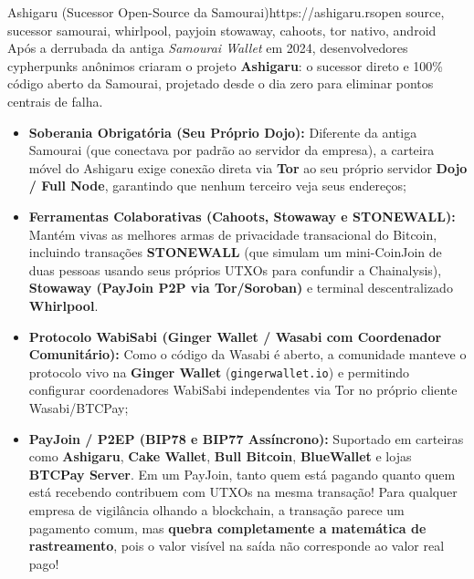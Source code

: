 \documentclass{pousadaguide}
\begin{document}
\begin{ferramenta}[recomendado,logo=ashigaru]{Ashigaru (Sucessor Open-Source da Samourai)}{https://ashigaru.rs}{open source, sucessor samourai, whirlpool, payjoin stowaway, cahoots, tor nativo, android}
Após a derrubada da antiga \emph{Samourai Wallet} em 2024, desenvolvedores cypherpunks anônimos criaram o projeto \textbf{Ashigaru}: o sucessor direto e 100\% código aberto da Samourai, projetado desde o dia zero para eliminar pontos centrais de falha.
\begin{itemize}
  \item \textbf{Soberania Obrigatória (Seu Próprio Dojo):} Diferente da antiga Samourai (que conectava por padrão ao servidor da empresa), a carteira móvel do Ashigaru exige conexão direta via \textbf{Tor} ao seu próprio servidor \textbf{Dojo / Full Node}, garantindo que nenhum terceiro veja seus endereços;
  \item \textbf{Ferramentas Colaborativas (Cahoots, Stowaway e STONEWALL):} Mantém vivas as melhores armas de privacidade transacional do Bitcoin, incluindo transações \textbf{STONEWALL} (que simulam um mini-CoinJoin de duas pessoas usando seus próprios UTXOs para confundir a Chainalysis), \textbf{Stowaway (PayJoin P2P via Tor/Soroban)} e terminal descentralizado \textbf{Whirlpool}.
\end{itemize}
\end{ferramenta}

\begin{nota}
\begin{itemize}
  \item \textbf{Protocolo WabiSabi (Ginger Wallet / Wasabi com Coordenador Comunitário):} Como o código da Wasabi é aberto, a comunidade manteve o protocolo vivo na \textbf{Ginger Wallet} (\texttt{gingerwallet.io}) e permitindo configurar coordenadores WabiSabi independentes via Tor no próprio cliente Wasabi/BTCPay;
  \item \textbf{PayJoin / P2EP (BIP78 e BIP77 Assíncrono):} Suportado em carteiras como \textbf{Ashigaru}, \textbf{Cake Wallet}, \textbf{Bull Bitcoin}, \textbf{BlueWallet} e lojas \textbf{BTCPay Server}. Em um PayJoin, tanto quem está pagando quanto quem está recebendo contribuem com UTXOs na mesma transação! Para qualquer empresa de vigilância olhando a blockchain, a transação parece um pagamento comum, mas \textbf{quebra completamente a matemática de rastreamento}, pois o valor visível na saída não corresponde ao valor real pago!
\end{itemize}
\end{nota}
\end{document}
